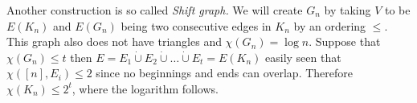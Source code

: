 \begin{example}
	Another construction is so called \textit{Shift graph.} We will create $G_n$ by taking $V$ to be $E(K_n)$ and $E(G_n)$ being two consecutive edges in $K_n$ by an ordering $\leq$. This graph also does not have triangles and $\chi(G_n) = \log n$. Suppose that $\chi(G_n) \leq t$ then $E = E_1 \dot\cup E_2 \dot\cup \dots \dot\cup E_t = E(K_n)$ easily seen that $\chi([n], E_i) \leq 2$ since no beginnings and ends can overlap. Therefore $\chi(K_n) \leq 2^t$, where the logarithm follows.
\end{example}